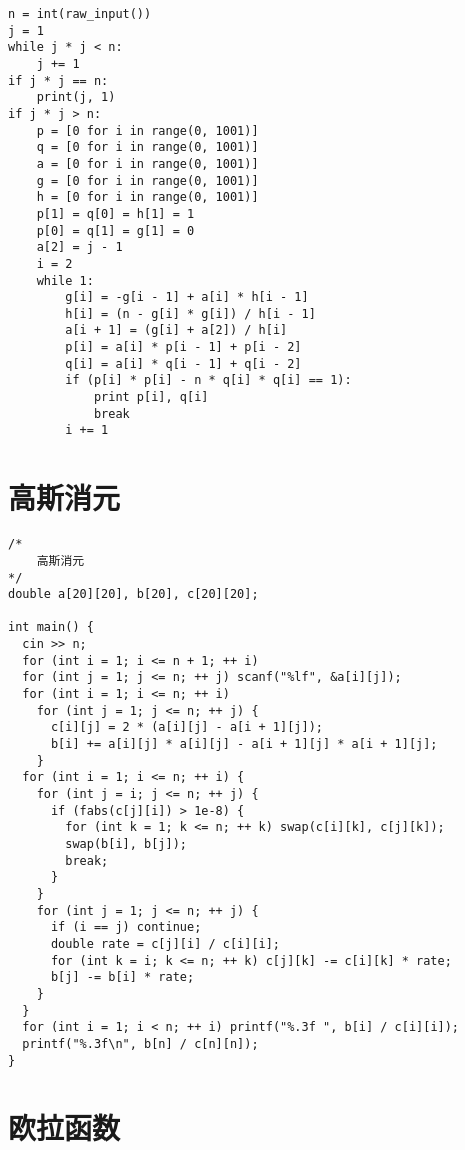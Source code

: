 \begin{lstlisting}
n = int(raw_input())
j = 1
while j * j < n:
    j += 1
if j * j == n:
    print(j, 1)
if j * j > n:
    p = [0 for i in range(0, 1001)]
    q = [0 for i in range(0, 1001)]
    a = [0 for i in range(0, 1001)]
    g = [0 for i in range(0, 1001)]
    h = [0 for i in range(0, 1001)]
    p[1] = q[0] = h[1] = 1
    p[0] = q[1] = g[1] = 0
    a[2] = j - 1
    i = 2
    while 1:
        g[i] = -g[i - 1] + a[i] * h[i - 1]
        h[i] = (n - g[i] * g[i]) / h[i - 1]
        a[i + 1] = (g[i] + a[2]) / h[i]
        p[i] = a[i] * p[i - 1] + p[i - 2]
        q[i] = a[i] * q[i - 1] + q[i - 2]
        if (p[i] * p[i] - n * q[i] * q[i] == 1):
            print p[i], q[i]
            break
        i += 1

\end{lstlisting}

\section{高斯消元}

\begin{lstlisting}
/*
    高斯消元
*/
double a[20][20], b[20], c[20][20];

int main() {
  cin >> n;
  for (int i = 1; i <= n + 1; ++ i)
  for (int j = 1; j <= n; ++ j) scanf("%lf", &a[i][j]);
  for (int i = 1; i <= n; ++ i)
    for (int j = 1; j <= n; ++ j) {
      c[i][j] = 2 * (a[i][j] - a[i + 1][j]);
      b[i] += a[i][j] * a[i][j] - a[i + 1][j] * a[i + 1][j];
    }
  for (int i = 1; i <= n; ++ i) {
    for (int j = i; j <= n; ++ j) {
      if (fabs(c[j][i]) > 1e-8) {
        for (int k = 1; k <= n; ++ k) swap(c[i][k], c[j][k]);
        swap(b[i], b[j]);
        break;
      }
    }
    for (int j = 1; j <= n; ++ j) {
      if (i == j) continue;
      double rate = c[j][i] / c[i][i];
      for (int k = i; k <= n; ++ k) c[j][k] -= c[i][k] * rate;
      b[j] -= b[i] * rate;
    }
  }
  for (int i = 1; i < n; ++ i) printf("%.3f ", b[i] / c[i][i]);
  printf("%.3f\n", b[n] / c[n][n]);
}
\end{lstlisting}

\section{欧拉函数}

